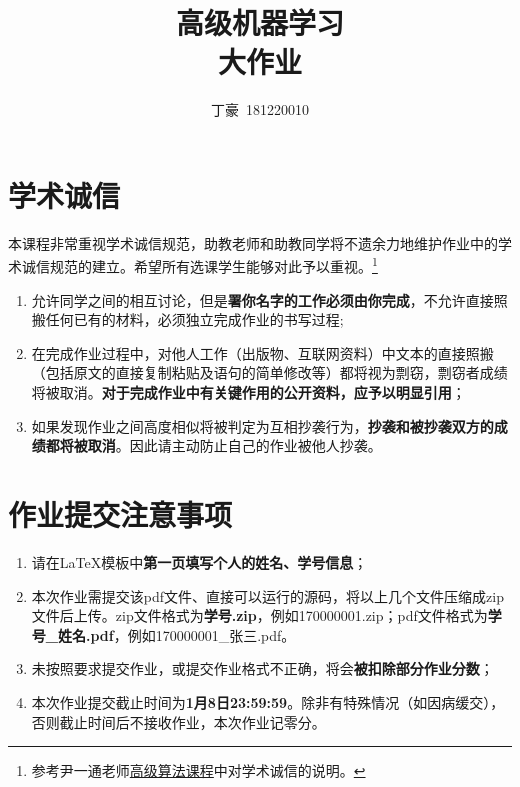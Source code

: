 \documentclass[a4paper,UTF8]{article}
\numberwithin{equation}{section}
\begin{document}
\title{高级机器学习\\
大作业}
\author{丁豪\, 181220010} 
\maketitle

\section*{学术诚信}

本课程非常重视学术诚信规范，助教老师和助教同学将不遗余力地维护作业中的学术诚信规范的建立。希望所有选课学生能够对此予以重视。\footnote{参考尹一通老师\href{http://tcs.nju.edu.cn/wiki/}{高级算法课程}中对学术诚信的说明。}

\begin{tcolorbox}
	\begin{enumerate}
		\item[(1)] 允许同学之间的相互讨论，但是{\color{red}\textbf{署你名字的工作必须由你完成}}，不允许直接照搬任何已有的材料，必须独立完成作业的书写过程;
		\item[(2)] 在完成作业过程中，对他人工作（出版物、互联网资料）中文本的直接照搬（包括原文的直接复制粘贴及语句的简单修改等）都将视为剽窃，剽窃者成绩将被取消。{\color{red}\textbf{对于完成作业中有关键作用的公开资料，应予以明显引用}}；
		\item[(3)] 如果发现作业之间高度相似将被判定为互相抄袭行为，{\color{red}\textbf{抄袭和被抄袭双方的成绩都将被取消}}。因此请主动防止自己的作业被他人抄袭。
	\end{enumerate}
\end{tcolorbox}

\section*{作业提交注意事项}
\begin{tcolorbox}
	\begin{enumerate}
		\item[(1)] 请在LaTeX模板中{\color{red}\textbf{第一页填写个人的姓名、学号信息}}；
		\item[(2)] 本次作业需提交该pdf文件、直接可以运行的源码，将以上几个文件压缩成zip文件后上传。zip文件格式为{\color{red}\textbf{学号.zip}}，例如170000001.zip；pdf文件格式为{\color{red}\textbf{学号\_姓名.pdf}}，例如170000001\_张三.pdf。
		\item[(3)] 未按照要求提交作业，或提交作业格式不正确，将会{\color{red}\textbf{被扣除部分作业分数}}；
		\item[(4)] 本次作业提交截止时间为{\color{red}\textbf{1月8日23:59:59}}。除非有特殊情况（如因病缓交），否则截止时间后不接收作业，本次作业记零分。
	\end{enumerate}
\end{tcolorbox}
\end{document}

